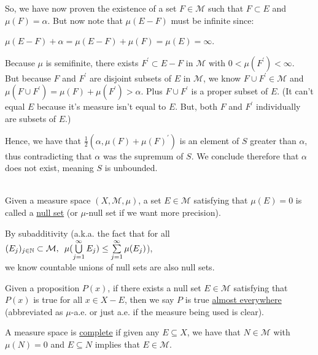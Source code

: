 \documentclass{book}
\newcommand{\hOne}{%
   \color{Black}%
   \fontsize{14}{16}\selectfont%
}
\newenvironment{myIndent}{%
   \begin{adjustwidth}{2.5em}{0em}%
}{%
   \end{adjustwidth}%
}
\newcommand{\udefine}[1]{{%
   \setulcolor{Red}%
   \setul{0.14em}{0.07em}%
   \ul{#1}%
}}
\newcommand{\myHS}{ \hspace{0.5em}}
\newcommand{\mySepTwo}[1][.]{%
   {\noindent\color{#1}{\rule{6.5in}{0.5mm}}}\\%
}
\newcommand{\retTwo}{\hfill\bigbreak}
\begin{document}
\begin{myIndent}
\begin{enumerate}
      So, we have now proven the existence of a set $F \in \mathcal{M}$ such that $F \subset E$ and\\ $\mu(F) = \alpha$. But now note that $\mu(E - F)$ must be infinite since:
      
      {\centering $\mu(E - F) + \alpha = \mu(E - F) + \mu(F) = \mu(E) = \infty$.\retTwo\par}

      Because $\mu$ is semifinite, there exists $F^\prime \subset E - F$ in $\mathcal{M}$ with $0 < \mu(F^\prime) < \infty$.\\ But because $F$ and $F^\prime$ are disjoint subsets of $E$ in $\mathcal{M}$, we know $F \cup F^\prime \in \mathcal{M}$ and $\mu(F \cup F^\prime) = \mu(F) + \mu(F^\prime) > \alpha$. Plus $F \cup F^\prime$ is a proper subset of $E$. (It can't equal $E$ because it's measure isn't equal to $E$. But, both $F$ and $F^\prime$ individually are subsets of $E$.)\retTwo

      Hence, we have that $\frac{1}{2}(\alpha, \mu(F) + \mu(F)^\prime)$ is an element of $S$ greater than $\alpha$, thus contradicting that $\alpha$ was the supremum of $S$. We conclude therefore that $\alpha$ does not exist, meaning $S$ is unbounded. 
   \end{enumerate}
\end{myIndent}

\mySepTwo

\hOne Given a measure space $(X, \mathcal{M}, \mu)$, a set $E \in \mathcal{M}$ satisfying that $\mu(E) = 0$ is called a \udefine{null set} (or $\mu$-null set if we want more precision).\retTwo

By subadditivity (a.k.a. the fact that for all $(E_j)_{j \in \mathbb{N}} \subset\mathcal{M},\myHS \mu(\bigcup\limits_{j=1}^\infty E_j) \leq \sum\limits_{j = 1}^\infty \mu(E_j)$),\\ [-8pt] we know countable unions of null sets are also null sets.\newpage

Given a proposition $P(x)$, if there exists a null set $E \in \mathcal{M}$ satisfying that $P(x)$ is true for all $x \in X - E$, then we say $P$ is true \udefine{almost everywhere} (abbreviated as $\mu$-a.e. or just a.e. if the measure being used is clear).\retTwo

A measure space is \udefine{complete} if given any $E \subseteq X$, we have that $N \in \mathcal{M}$ with\\ $\mu(N) = 0$ and $E \subseteq N$ implies that $E \in \mathcal{M}$.
\end{document}

